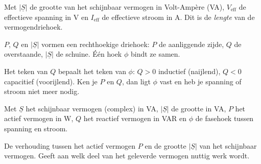 \documentclass[a4paper,11pt]{article}
\begin{document}

{Met $|\underline{S}|$ de grootte van het schijnbaar vermogen in Volt-Ampère (VA), $V_{\text{eff}}$
    de effectieve spanning in V en $I_{\text{eff}}$ de effectieve stroom in A.
    Dit is de \emph{lengte} van de vermogendriehoek.}

\begin{conceptbox}[Vermogendriehoek]
    $P$, $Q$ en $|\underline{S}|$ vormen een rechthoekige driehoek: $P$ de aanliggende zijde, $Q$ de
    overstaande, $|\underline{S}|$ de schuine. \'E\'en hoek $\phi$ bindt ze samen.
    \begin{center}
    \end{center}
\end{conceptbox}

Het teken van $Q$ bepaalt het teken van $\phi$: $Q > 0$ inductief (naijlend), $Q < 0$ capacitief
(voorijlend). Ken je $P$ en $Q$, dan ligt $\phi$ vast en heb je spanning of stroom niet meer nodig.

{Met $\underline{S}$ het schijnbaar vermogen (complex) in VA, $|\underline{S}|$ de grootte in VA,
    $P$ het actief vermogen in W, $Q$ het reactief vermogen in VAR en $\phi$ de fasehoek tussen
    spanning en stroom.}

{De verhouding tussen het actief vermogen $P$ en de grootte $|\underline{S}|$ van het schijnbaar
    vermogen. Geeft aan welk deel van het geleverde vermogen nuttig werk wordt.}
\end{document}
